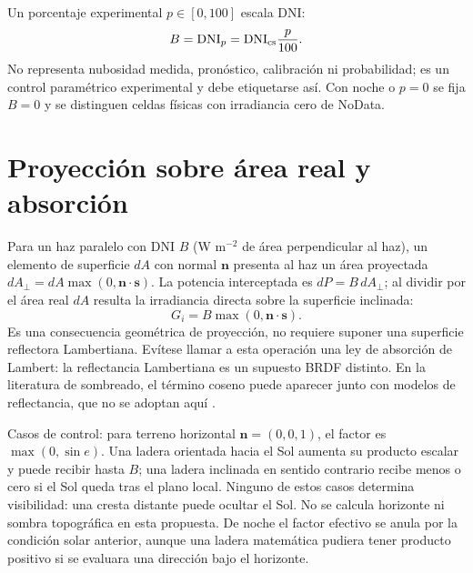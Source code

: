 \documentclass[11pt,a4paper]{article}
\begin{document}
Un porcentaje experimental $p\in[0,100]$ escala DNI:
\begin{equation}
 B=\mathrm{DNI}_{p}=\mathrm{DNI}_{\rm cs}\frac{p}{100}.\label{eq:intensity}
\end{equation}
No representa nubosidad medida, pronóstico, calibración ni probabilidad; es un control paramétrico experimental y debe etiquetarse así. Con noche o $p=0$ se fija $B=0$ y se distinguen celdas físicas con irradiancia cero de NoData.

\section{Proyección sobre área real y absorción}
Para un haz paralelo con DNI $B$ (W m$^{-2}$ de área perpendicular al haz), un elemento de superficie $dA$ con normal $\mathbf n$ presenta al haz un área proyectada $dA_{\perp}=dA\max(0,\mathbf n\cdot\mathbf s)$. La potencia interceptada es $dP=B\,dA_{\perp}$; al dividir por el área real $dA$ resulta la irradiancia directa sobre la superficie inclinada:
\begin{equation}
 G_i=B\max(0,\mathbf n\cdot\mathbf s).\label{eq:incidence}
\end{equation}
Es una consecuencia geométrica de proyección, no requiere suponer una superficie reflectora Lambertiana. Evítese llamar a esta operación una ley de absorción de Lambert: la reflectancia Lambertiana es un supuesto BRDF distinto. En la literatura de sombreado, el término coseno puede aparecer junto con modelos de reflectancia, que no se adoptan aquí \cite{horn1981}.

Casos de control: para terreno horizontal $\mathbf n=(0,0,1)$, el factor es $\max(0,\sin e)$. Una ladera orientada hacia el Sol aumenta su producto escalar y puede recibir hasta $B$; una ladera inclinada en sentido contrario recibe menos o cero si el Sol queda tras el plano local. Ninguno de estos casos determina visibilidad: una cresta distante puede ocultar el Sol. No se calcula horizonte ni sombra topográfica en esta propuesta. De noche el factor efectivo se anula por la condición solar anterior, aunque una ladera matemática pudiera tener producto positivo si se evaluara una dirección bajo el horizonte.
\end{document}
